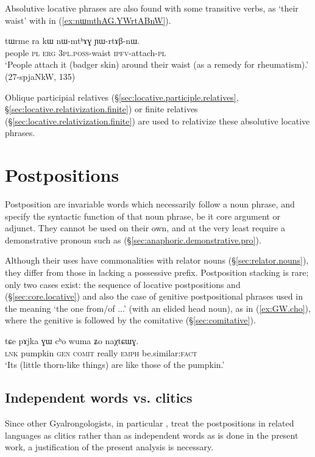 Absolutive locative phrases are also found with some transitive verbs, as  `their waist' with  in (\ref{ex:nɯmthAG.YWrtABnW}). 

\begin{exe}
\ex \label{ex:nɯmthAG.YWrtABnW}
 \gll tɯrme ra kɯ nɯ-mtʰɤɣ ɲɯ-rtɤβ-nɯ. \\
 people \textsc{pl} \textsc{erg} \textsc{3pl}.\textsc{poss}-waist \textsc{ipfv}-attach-\textsc{pl} \\
 \glt `People attach it (badger skin) around their waist (as a remedy for rheumatism).' (27-spjaNkW, 135)
\end{exe}

Oblique participial relatives (§\ref{sec:locative.participle.relatives}, §\ref{sec:locative.relativization.finite}) or finite relatives (§\ref{sec:locative.relativization.finite}) are used to relativize these absolutive locative phrases.

\section{Postpositions} \label{ex:postpositions}
Postposition are invariable words which necessarily follow a noun phrase, and specify the syntactic function of that noun phrase, be it core argument or adjunct. They cannot be used on their own, and at the very least require a demonstrative pronoun such as  (§\ref{sec:anaphoric.demonstrative.pro}). 

Although their uses have commonalities with relator nouns (§\ref{sec:relator.nouns}), they differ from those in lacking a possessive prefix. Postposition stacking is rare; only two cases exist: the sequence of locative postpositions  and  (§\ref{sec:core.locative}) and also the case of genitive postpositional phrases used in the meaning `the one from/of ...' (with an elided head noun), as in (\ref{ex:GW.cho}), where the genitive  is followed by the comitative (§\ref{sec:comitative}). 

\begin{exe}
\ex \label{ex:GW.cho}
 \gll tɕe pɤjka ɣɯ cʰo wuma ʑo naχtɕɯɣ. \\
 \textsc{lnk} pumpkin \textsc{gen} \textsc{comit} really \textsc{emph} be.similar:\textsc{fact} \\
 \glt `Its (little thorn-like things) are like those of the pumpkin.' 
 \end{exe}
 
\subsection{Independent words vs. clitics}  \label{ex:word.vs.clitic.postp}  
Since other Gyalrongologists, in particular \citet{jackson98morphology, jackson14morpho}, treat the postpositions in related languages as clitics rather than as independent words as is done in the present work, a justification of the present analysis is necessary.

